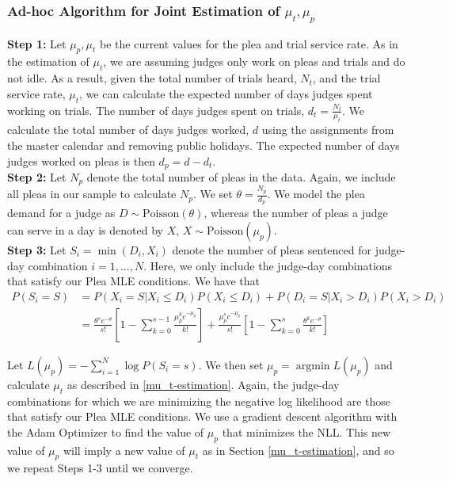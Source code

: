 \documentclass[11pt, oneside]{article}   	%
\theoremstyle{ModifiedStyle}
\DeclareMathOperator*{\argmin}{argmin}
\begin{document}
		\subsubsection{Ad-hoc Algorithm for Joint Estimation of $\mu_t,\mu_p$}
			\textbf{Step 1:} Let $\mu_p,\mu_t$ be the current values for the plea and trial service rate. As in the estimation of $\mu_t$, we are assuming judges only work on pleas and trials and do not idle. As a result, given the total number of trials heard, $N_{t}$, and the trial service rate, $\mu_t$, we can calculate the expected number of days judges spent working on trials. The number of days judges spent on trials, $d_{t} = \frac{N_{t}}{\mu_t}$. We calculate the total number of days judges worked, $d$ using the assignments from the master calendar and removing public holidays. The expected number of days judges worked on pleas is then $d_{p} = d - d_{t}$. \\

			\noindent \textbf{Step 2:} Let $N_p$ denote the total number of pleas in the data. Again, we include all pleas in our sample to calculate $N_p$. We set $\theta = \frac{N_p}{d_p}$. We model the plea demand for a judge as $D \sim \text{Poisson}(\theta)$, whereas the number of pleas a judge can serve in a day is denoted by $X$, $X \sim \text{Poisson}(\mu_p)$. \\

			\noindent \textbf{Step 3:} Let $S_i = \min(D_i,X_i)$ denote the number of pleas sentenced for judge-day combination $i=1,...,N$. Here, we only include the judge-day combinations that satisfy our Plea MLE conditions. We have that
			\begin{align*}
				P(S_i = S) &= P(X_i = S | X_i \leq D_i) P(X_i \leq D_i) + P(D_i = S | X_i > D_i) P(X_i > D_i) \\
					&= \frac{\theta^s e^{-\theta}}{s!}[1-\sum_{k=0}^{s-1}\frac{\mu_p^k e^{-\mu_p}}{k!}] + \frac{\mu_p^s e^{-\mu_p}}{s!}[1-\sum_{k=0}^s \frac{\theta^k e^{-\theta}}{k!}]
			\end{align*}

			Let $L(\mu_p) = -\sum_{i=1}^N \log P(S_i = s)$. We then set
			 $\mu_p = \argmin L(\mu_p)$ and calculate $\mu_t$ as described in \ref{mu_t-estimation}. Again, the judge-day combinations for which we are minimizing the negative log likelihood are those that satisfy our Plea MLE conditions. We use a gradient descent algorithm with the Adam Optimizer to find the value of $\mu_p$ that minimizes the NLL. This new value of $\mu_p$ will imply a new value of $\mu_t$ as in Section \ref{mu_t-estimation}, and so we repeat Steps 1-3 until we converge.
\end{document}
